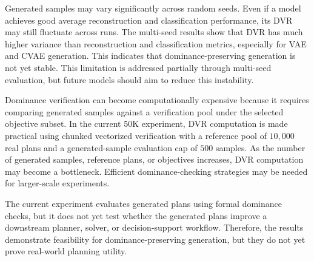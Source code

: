 Generated samples may vary significantly across random seeds. Even if a model achieves good average reconstruction and classification performance, its DVR may still fluctuate across runs. The multi-seed results show that DVR has much higher variance than reconstruction and classification metrics, especially for VAE and CVAE generation. This indicates that dominance-preserving generation is not yet stable. This limitation is addressed partially through multi-seed evaluation, but future models should aim to reduce this instability.

Dominance verification can become computationally expensive because it requires comparing generated samples against a verification pool under the selected objective subset. In the current 50K experiment, DVR computation is made practical using chunked vectorized verification with a reference pool of $10{,}000$ real plans and a generated-sample evaluation cap of $500$ samples. As the number of generated samples, reference plans, or objectives increases, DVR computation may become a bottleneck. Efficient dominance-checking strategies may be needed for larger-scale experiments.

The current experiment evaluates generated plans using formal dominance checks, but it does not yet test whether the generated plans improve a downstream planner, solver, or decision-support workflow. Therefore, the results demonstrate feasibility for dominance-preserving generation, but they do not yet prove real-world planning utility.